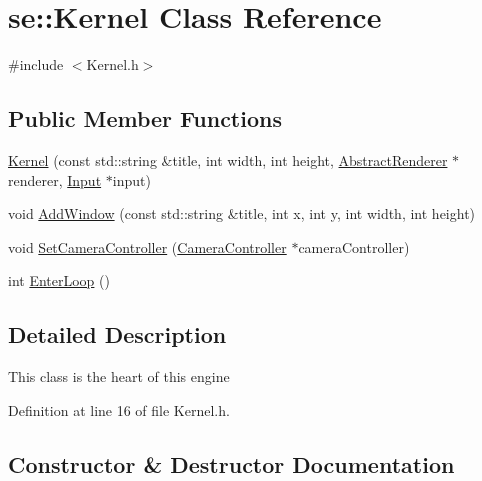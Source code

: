 \hypertarget{classse_1_1_kernel}{}\section{se\+:\+:Kernel Class Reference}
\label{classse_1_1_kernel}


{\ttfamily \#include $<$Kernel.\+h$>$}

\subsection*{Public Member Functions}
\begin{DoxyCompactItemize}
\item 
\mbox{\hyperlink{classse_1_1_kernel_a28fa4e75a4f693d01e96f63849d9cf15}{Kernel}} (const std\+::string \&title, int width, int height, \mbox{\hyperlink{classse_1_1_abstract_renderer}{Abstract\+Renderer}} $\ast$renderer, \mbox{\hyperlink{classse_1_1_input}{Input}} $\ast$input)
\item 
void \mbox{\hyperlink{classse_1_1_kernel_aa65f624076feaa97a95901077df35357}{Add\+Window}} (const std\+::string \&title, int x, int y, int width, int height)
\item 
void \mbox{\hyperlink{classse_1_1_kernel_a60a807b4f4e928752e7512f5b7b4a17c}{Set\+Camera\+Controller}} (\mbox{\hyperlink{classse_1_1_camera_controller}{Camera\+Controller}} $\ast$camera\+Controller)
\item 
int \mbox{\hyperlink{classse_1_1_kernel_a1faeac6fce02ccd7ff76d94ad78e0754}{Enter\+Loop}} ()
\end{DoxyCompactItemize}


\subsection{Detailed Description}
This class is the heart of this engine 

Definition at line 16 of file Kernel.\+h.



\subsection{Constructor \& Destructor Documentation}
\mbox{\label{classse_1_1_kernel_a28fa4e75a4f693d01e96f63849d9cf15}} 
